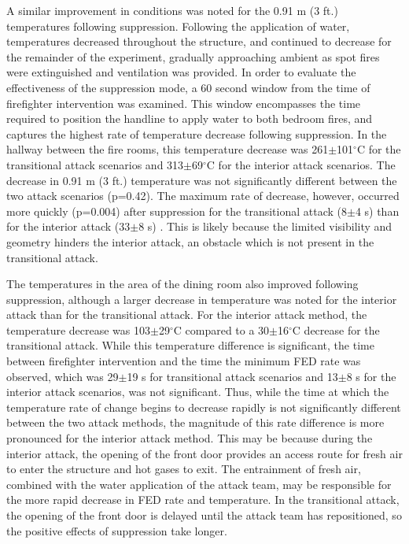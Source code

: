 \documentclass[12pt,oneside]{article}
\begin{document}
A similar improvement in conditions was noted for the 0.91 m (3 ft.) temperatures following suppression. Following the application of water, temperatures decreased throughout the structure, and continued to decrease for the remainder of the experiment, gradually approaching ambient as spot fires were extinguished and ventilation was provided. In order to evaluate the effectiveness of the suppression mode, a 60 second window from the time of firefighter intervention was examined. This window encompasses the time required to position the handline to apply water to both bedroom fires, and captures the highest rate of temperature decrease following suppression. In the hallway between the fire rooms, this temperature decrease was 261$\pm$101$^{\circ}$C for the transitional attack scenarios and 313$\pm$69$^{\circ}$C for the interior attack scenarios. The decrease in 0.91 m (3 ft.) temperature was not significantly different between the two attack scenarios (p=0.42). The maximum rate of decrease, however, occurred more quickly (p=0.004) after suppression for the transitional attack (8$\pm$4 s) than for the interior attack (33$\pm$8 s) . This is likely because the limited visibility and geometry hinders the interior attack, an obstacle which is not present in the transitional attack. 

The temperatures in the area of the dining room also improved following suppression, although a larger decrease in temperature was noted for the interior attack than for the transitional attack. For the interior attack method, the temperature decrease was 103$\pm$29$^{\circ}$C compared to a 30$\pm$16$^{\circ}$C decrease for the transitional attack. While this temperature difference is significant, the time between firefighter intervention and the time the minimum FED rate was observed, which was 29$\pm$19 s for transitional attack scenarios and 13$\pm$8 s for the interior attack scenarios, was not significant. Thus, while the time at which the temperature rate of change begins to decrease rapidly is not significantly different between the two attack methods, the magnitude of this rate difference is more pronounced for the interior attack method. This may be because during the interior attack, the opening of the front door provides an access route for fresh air to enter the structure and hot gases to exit. The entrainment of fresh air, combined with the water application of the attack team, may be responsible for the more rapid decrease in FED rate and temperature. In the transitional attack, the opening of the front door is delayed until the attack team has repositioned, so the positive effects of suppression take longer.
\end{document}
